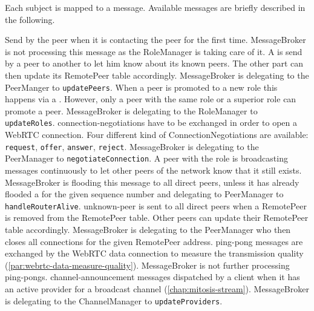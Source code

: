 Each subject is mapped to a message. Available messages are briefly described in the following.
\begin{itemize}
    \label{itm:mit-msg-introduction}
        Send by the peer when it is contacting the \signal peer for the first time. 
        MessageBroker is not processing this message as the RoleManager is taking care of it.
    \label{itm:mit-msg-PeerUpdate}
        A \peerUpdate is send by a peer to another to let him know about its known peers. The other part can then update its RemotePeer table accordingly.
        MessageBroker is delegating to the PeerManger to \lstinline|updatePeers|.
    \label{itm:mit-msg-RoleUpdate}
        When a peer is promoted to a new role this happens via a \roleUpdate. However, only a peer with the same role or a superior role can promote a peer.
        MessageBroker is delegating to the RoleManager to \lstinline|updateRoles|.
    \label{itm:mit-msg-ConnectionNegotiation}
        \Glspl{connection-negotiation} have to be exchanged in order to open a WebRTC connection. Four different kind of ConnectionNegotiations are available: \lstinline|request|, \lstinline|offer|, \lstinline|answer|, \lstinline|reject|.
        MessageBroker is delegating to the PeerManager to \lstinline|negotiateConnection|.
    \label{itm:mit-msg-RouterAlive}
        A peer with the role \routerRole is broadcasting \routerAlive messages continuously to let other peers of the network know that it still exists.
        MessageBroker is flooding this message to all direct peers, unless it has already flooded a \routerAlive for the given sequence number and delegating to PeerManager to \lstinline|handleRouterAlive|.
    \label{itm:mit-msg-UnknownPeer}
        \Gls{unknown-peer} is sent to all direct peers when a RemotePeer is removed from the RemotePeer table. Other peers can update their RemotePeer table accordingly.
        MessageBroker is delegating to the PeerManager who then closes all connections for the given RemotePeer address.
    \label{itm:mit-msg-PingPong}
        \Gls{ping-pong} messages are exchanged by the WebRTC data connection to measure the transmission quality (\vref{par:webrtc-data-measure-quality}).
        MessageBroker is not further processing \glspl{ping-pong}.
    \label{itm:mit-msg-ChannelAnnouncement}
        \Gls{channel-announcement} messages dispatched by a client when it has an active provider for a broadcast channel (\vref{chap:mitosis-stream}).
        MessageBroker is delegating to the ChannelManager to \lstinline|updateProviders|.   
\end{itemize}